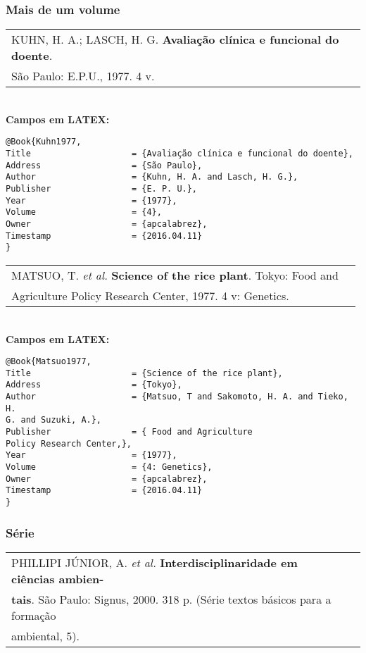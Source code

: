\subsubsection{Mais de um volume}

\begin{tabular}{|l|c|} \hline
	KUHN, H. A.; LASCH, H. G. \textbf{Avaliação clínica e funcional do doente}. \\São Paulo:  E.P.U., 1977. 4 v.    \\\hline
\end{tabular}\\

\textbf{Campos em LATEX:}

\begin{verbatim}
@Book{Kuhn1977,
Title                    = {Avaliação clínica e funcional do doente},
Address                  = {São Paulo},
Author                   = {Kuhn, H. A. and Lasch, H. G.},
Publisher                = {E. P. U.},
Year                     = {1977},
Volume                   = {4},
Owner                    = {apcalabrez},
Timestamp                = {2016.04.11}
}
\end{verbatim}

\begin{tabular}{|l|c|} \hline
	MATSUO, T. \textit{et al.}  \textbf{ Science of the rice plant}. Tokyo: Food and \\ Agriculture Policy Research Center, 1977. 4 v: Genetics. \\\hline
\end{tabular}\\

\textbf{Campos em LATEX:}

\begin{verbatim}
@Book{Matsuo1977,
Title                    = {Science of the rice plant},
Address                  = {Tokyo},
Author                   = {Matsuo, T and Sakomoto, H. A. and Tieko, H. 
G. and Suzuki, A.},
Publisher                = { Food and Agriculture
Policy Research Center,},
Year                     = {1977},
Volume                   = {4: Genetics},
Owner                    = {apcalabrez},
Timestamp                = {2016.04.11}
}
\end{verbatim}

\subsubsection{Série}

\begin{tabular}{|l|c|} \hline
	PHILLIPI JÚNIOR, A. \textit{et al.} \textbf{Interdisciplinaridade em ciências ambien-}\\ 
	\textbf{tais}. São Paulo: Signus, 2000. 318 p. (Série textos básicos para a formação \\ambiental, 5). \\\hline
\end{tabular}\\

